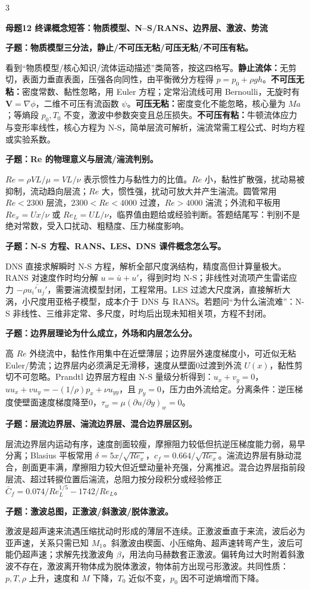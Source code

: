 \documentclass[a4paper]{article}
\newcommand{\mt}[1]{\vspace{0.45pt}\colorbox{M}{\parbox{\dimexpr\linewidth-2\fboxsep}{\color{white}\bfseries #1}}\par}
\newcommand{\qt}[1]{\vspace{0.25pt}\colorbox{Q}{\parbox{\dimexpr\linewidth-2\fboxsep}{\color{white}\bfseries #1}}\par}
\newcommand{\ans}[1]{\colorbox{G}{\parbox{\dimexpr\linewidth-2\fboxsep}{#1}}\par}
\begin{document}
\begin{multicols}{3}
\mt{母题12 终课概念短答：物质模型、N--S/RANS、边界层、激波、势流}
\qt{子题：物质模型三分法，静止/不可压无粘/可压无粘/不可压有粘。}
\ans{看到“物质模型/核心知识/流体运动描述”类简答，按这四格写。\textbf{静止流体：}无剪切，表面力垂直表面，压强各向同性，由平衡微分方程得 $p=p_0+\rho gh$。\textbf{不可压无粘：}密度常数、黏性忽略，用 Euler 方程；定常沿流线可用 Bernoulli，无旋时有 $\bm V=\nabla\phi$，二维不可压有流函数 $\psi$。\textbf{可压无粘：}密度变化不能忽略，核心量为 $Ma$；等熵段 $p_0,T_0$ 不变，激波中参数突变且总压损失。\textbf{不可压有粘：}牛顿流体应力与变形率线性，核心方程为 N-S，简单层流可解析，湍流常需工程公式、时均方程或实验系数。}
\qt{子题：Re 的物理意义与层流/湍流判别。}
\ans{$Re=\rho VL/\mu=VL/\nu$ 表示惯性力与黏性力的比值。$Re$ 小，黏性扩散强，扰动易被抑制，流动趋向层流；$Re$ 大，惯性强，扰动可放大并产生湍流。圆管常用 $Re<2300$ 层流，$2300<Re<4000$ 过渡，$Re>4000$ 湍流；外流和平板用 $Re_x=Ux/\nu$ 或 $Re_L=UL/\nu$，临界值由题给或经验判断。答题结尾写：判别不是绝对常数，受入口扰动、粗糙度、压力梯度影响。}
\qt{子题：N-S 方程、RANS、LES、DNS 课件概念怎么写。}
\ans{DNS 直接求解瞬时 N-S 方程，解析全部尺度涡结构，精度高但计算量极大。RANS 对速度作时均分解 $u=\bar u+u'$，得到时均 N-S；非线性对流项产生雷诺应力 $-\rho\overline{u_i'u_j'}$，需要湍流模型封闭，工程常用。LES 过滤大尺度涡，直接解析大涡，小尺度用亚格子模型，成本介于 DNS 与 RANS。若题问“为什么湍流难”：N-S 非线性、三维非定常、多尺度，时均后出现未知相关项，方程不封闭。}
\qt{子题：边界层理论为什么成立，外场和内层怎么分。}
\ans{高 $Re$ 外绕流中，黏性作用集中在近壁薄层；边界层外速度梯度小，可近似无粘 Euler/势流；边界层内必须满足无滑移，速度从壁面0过渡到外流 $U(x)$，黏性剪切不可忽略。Prandtl 边界层方程由 N-S 量级分析得到：$u_x+v_y=0$，$uu_x+vu_y=-(1/\rho)p_x+\nu u_{yy}$，且 $p_y=0$，压力由外流给定。分离条件：逆压梯度使壁面速度梯度降至0，$\tau_w=\mu(\partial u/\partial y)_w=0$。}
\qt{子题：层流边界层、湍流边界层、混合边界层区别。}
\ans{层流边界层内运动有序，速度剖面较瘦，摩擦阻力较低但抗逆压梯度能力弱，易早分离；Blasius 平板常用 $\delta=5x/\sqrt{Re_x}$，$c_f=0.664/\sqrt{Re_x}$。湍流边界层有脉动混合，剖面更丰满，摩擦阻力较大但近壁动量补充强，分离推迟。混合边界层指前段层流、超过转捩位置后湍流，总阻力按分段积分或经验修正 $\bar C_f=0.074/Re_L^{1/5}-1742/Re_L$。}
\qt{子题：激波总图，正激波/斜激波/脱体激波。}
\ans{激波是超声速来流遇压缩扰动时形成的薄层不连续。正激波垂直于来流，波后必为亚声速，关系只需已知 $M_1$。斜激波由楔面、小压缩角、超声速转弯产生，波后可能仍超声速；求解先找激波角 $\beta$，用法向马赫数套正激波。偏转角过大时附着斜激波不存在，激波离开物体成为脱体激波，物体前方出现弓形激波。共同性质：$p,T,\rho$ 上升，速度和 $M$ 下降，$T_0$ 近似不变，$p_0$ 因不可逆熵增而下降。}

\end{multicols}
\end{document}
